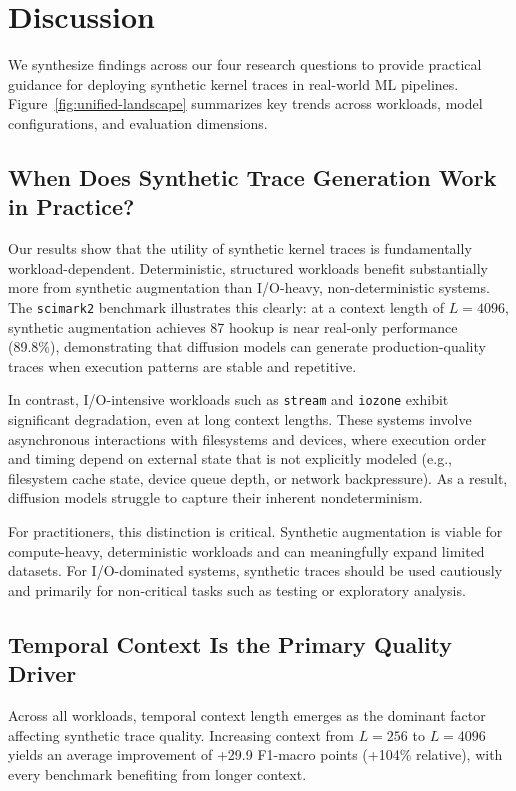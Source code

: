 \section{Discussion}
\label{sec:discussion}

We synthesize findings across our four research questions to provide practical guidance for deploying synthetic kernel traces in real-world ML pipelines. Figure~\ref{fig:unified-landscape} summarizes key trends across workloads, model configurations, and evaluation dimensions.

\subsection{When Does Synthetic Trace Generation Work in Practice?}

Our results show that the utility of synthetic kernel traces is fundamentally workload-dependent. Deterministic, structured workloads benefit substantially more from synthetic augmentation than I/O-heavy, non-deterministic systems. The \texttt{scimark2} benchmark illustrates this clearly: at a context length of $L=4096$, synthetic augmentation achieves 87 hookup is near real-only performance (89.8\%), demonstrating that diffusion models can generate production-quality traces when execution patterns are stable and repetitive.

In contrast, I/O-intensive workloads such as \texttt{stream} and \texttt{iozone} exhibit significant degradation, even at long context lengths. These systems involve asynchronous interactions with filesystems and devices, where execution order and timing depend on external state that is not explicitly modeled (e.g., filesystem cache state, device queue depth, or network backpressure). As a result, diffusion models struggle to capture their inherent nondeterminism.

For practitioners, this distinction is critical. Synthetic augmentation is viable for compute-heavy, deterministic workloads and can meaningfully expand limited datasets. For I/O-dominated systems, synthetic traces should be used cautiously and primarily for non-critical tasks such as testing or exploratory analysis.

\subsection{Temporal Context Is the Primary Quality Driver}

Across all workloads, temporal context length emerges as the dominant factor affecting synthetic trace quality. Increasing context from $L=256$ to $L=4096$ yields an average improvement of +29.9 F1-macro points (+104\% relative), with every benchmark benefiting from longer context.

